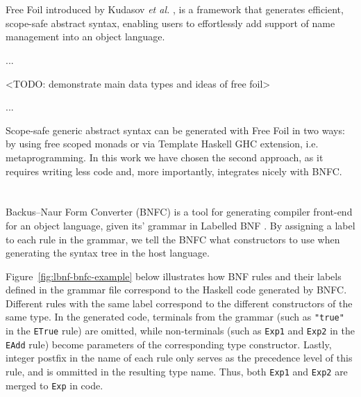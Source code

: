 
\section{}

Free Foil introduced by Kudasov \textit{et al.} \cite{FreeFoil}, is a framework that generates efficient, scope-safe abstract syntax, enabling users to effortlessly add support of name management into an object language.

...

<TODO: demonstrate main data types and ideas of free foil>

...

Scope-safe generic abstract syntax can be generated with Free Foil in two ways: by using free scoped monads or via Template Haskell \cite{SheardPeytonJones2002_TH} GHC extension, i.e. metaprogramming. In this work we have chosen the second approach, as it requires writing less code and, more importantly, integrates nicely with BNFC.


\section{}

Backus–Naur Form Converter (BNFC) \cite{BNFC} is a tool for generating compiler front-end for an object language, given its' grammar in Labelled BNF \cite{BackusNaurForm2003}. By assigning a label to each rule in the grammar, we tell the BNFC what constructors to use when generating the syntax tree in the host language.

Figure~\ref{fig:lbnf-bnfc-example} below illustrates how BNF rules and their labels defined in the grammar file correspond to the Haskell code generated by BNFC. Different rules with the same label correspond to the different constructors of the same type. In the generated code, terminals from the grammar (such as \texttt{"true"} in the \texttt{ETrue} rule) are omitted, while non-terminals (such as \texttt{Exp1} and \texttt{Exp2} in the \texttt{EAdd} rule) become parameters of the corresponding type constructor. Lastly, integer postfix in the name of each rule only serves as the precedence level of this rule, and is ommitted in the resulting type name. Thus, both \texttt{Exp1} and \texttt{Exp2} are merged to \texttt{Exp} in code.

